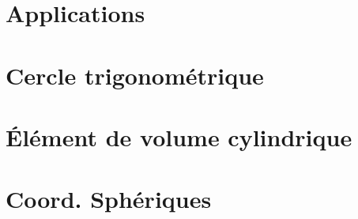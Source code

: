\section{Applications}




\section*{Cercle trigonométrique}
\centering


\section*{Élément de volume cylindrique}
\resizebox{!}{0.35\textwidth}{

}

\section*{Coord. Sphériques}
\resizebox{!}{0.25\textwidth}{

}

